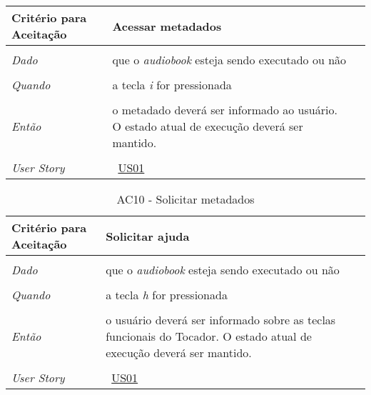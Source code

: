 \begin{apendicesenv}
\begin{table}[ht]
\begin{center}
\begin{tabularx}{\textwidth}{|lX|l|}
\hline
\textbf{Critério para Aceitação} & Acessar metadados \\
\hline
 & \\
\textit{Dado} & que o \textit{audiobook} esteja sendo executado ou não \\
 & \\
\textit{Quando} & a tecla \textit{i} for pressionada \\
 & \\
\textit{Então} & o metadado deverá ser informado ao usuário. O estado atual de execução deverá ser mantido. \\
 & \\
\hline
\textit{User Story} & ~\hyperref[tab:us01]{US01} \\
\hline

\end{tabularx}
\end{center}
\label{tab:us01a9}
\end{table}


\begin{table}[ht]
\centering
\caption{AC10 - Solicitar metadados}
\vspace{0.1cm}
\begin{center}
\begin{tabularx}{\textwidth}{|lX|l|}

\hline
\textbf{Critério para Aceitação} & Solicitar ajuda \\
\hline
 & \\
\textit{Dado} & que o \textit{audiobook} esteja sendo executado ou não \\
 & \\
\textit{Quando} & a tecla \textit{h} for pressionada \\
 & \\
\textit{Então} & o usuário deverá ser informado sobre as teclas funcionais do Tocador. O estado atual de execução deverá ser mantido. \\
 & \\
\hline
\textit{User Story} & ~\hyperref[tab:us01]{US01} \\
\hline

\end{tabularx}
\end{center}
\label{tab:us01a10}
\end{table}


\end{apendicesenv}
